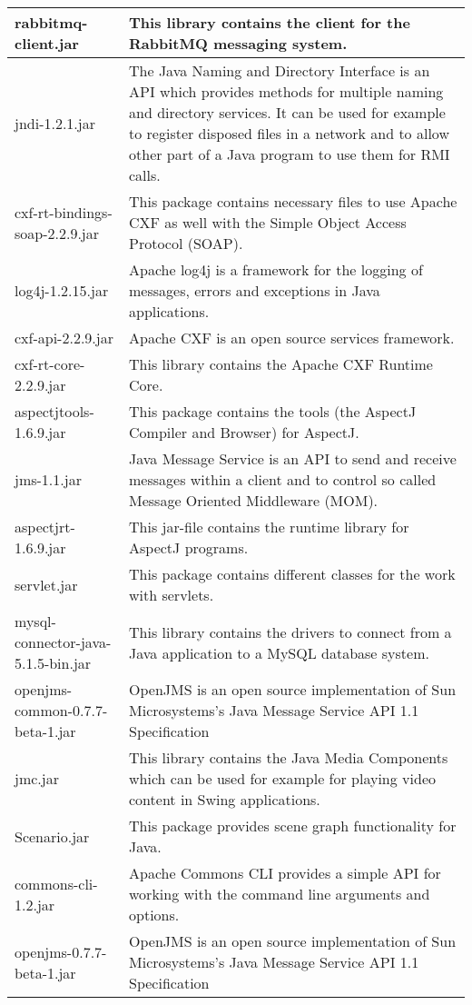 \begin{center}
\begin{longtable}{|p{}|p{}|}
\hline 
rabbitmq-client.jar & This library contains the client for the RabbitMQ messaging system.\\
\hline 
jndi-1.2.1.jar & The Java Naming and Directory Interface is an API which provides methods for multiple naming and directory services. It can be used for example to register disposed files in a network and to allow other part of a Java program to use them for RMI calls.\\
\hline 
cxf-rt-bindings-soap-2.2.9.jar & This package contains necessary files to use Apache CXF as well with the Simple Object Access Protocol (SOAP).\\
\hline 
log4j-1.2.15.jar & Apache log4j is a framework for the logging of messages, errors and exceptions in Java applications.\\
\hline 
cxf-api-2.2.9.jar & Apache CXF is an open source services framework.  \\
\hline 
cxf-rt-core-2.2.9.jar & This library contains the Apache CXF Runtime Core. \\
\hline 
aspectjtools-1.6.9.jar & This package contains the tools (the AspectJ Compiler and Browser) for AspectJ.\\
\hline 
jms-1.1.jar & Java Message Service is an API to send and receive messages within a client and to control so called Message Oriented Middleware (MOM).\\
\hline 
aspectjrt-1.6.9.jar & This jar-file contains the runtime library for AspectJ programs.\\
\hline 
servlet.jar & This package contains different classes for the work with servlets.\\
\hline 
mysql-connector-java-5.1.5-bin.jar & This library contains the drivers to connect from a Java application to a MySQL database system.\\
\hline 
openjms-common-0.7.7-beta-1.jar & OpenJMS is an open source implementation of Sun Microsystems's Java Message Service API 1.1 Specification\\
\hline 
jmc.jar & This library contains the Java Media Components which can be used for example for playing video content in Swing applications.\\
\hline 
Scenario.jar & This package provides scene graph functionality for Java.\\
\hline 
commons-cli-1.2.jar & Apache Commons CLI provides a simple API for working with the command line arguments and options.\\
\hline 
openjms-0.7.7-beta-1.jar & OpenJMS is an open source implementation of Sun Microsystems's Java Message Service API 1.1 Specification\\
\hline 
\end{longtable}
\label{tabular:libraries}
\end{center}
